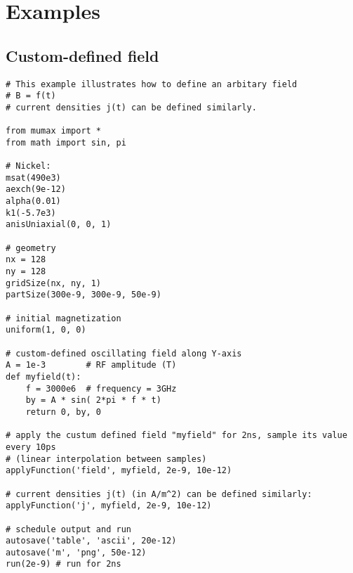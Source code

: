 \section{Examples}

\subsection{Custom-defined field}


\begin{verbatim}
# This example illustrates how to define an arbitary field
# B = f(t)
# current densities j(t) can be defined similarly.

from mumax import *
from math import sin, pi

# Nickel:
msat(490e3)   
aexch(9e-12)     
alpha(0.01)
k1(-5.7e3)
anisUniaxial(0, 0, 1)

# geometry 
nx = 128
ny = 128
gridSize(nx, ny, 1)    
partSize(300e-9, 300e-9, 50e-9)

# initial magnetization
uniform(1, 0, 0)

# custom-defined oscillating field along Y-axis
A = 1e-3    	# RF amplitude (T)
def myfield(t):
    f = 3000e6  # frequency = 3GHz
    by = A * sin( 2*pi * f * t)
    return 0, by, 0

# apply the custum defined field "myfield" for 2ns, sample its value every 10ps
# (linear interpolation between samples)
applyFunction('field', myfield, 2e-9, 10e-12) 

# current densities j(t) (in A/m^2) can be defined similarly:
applyFunction('j', myfield, 2e-9, 10e-12) 

# schedule output and run
autosave('table', 'ascii', 20e-12)
autosave('m', 'png', 50e-12)
run(2e-9) # run for 2ns

\end{verbatim}









\subsection{}

